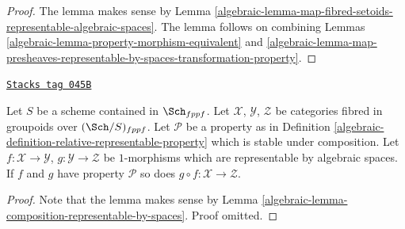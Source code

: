 \begin{proof}

The lemma makes sense by
Lemma \ref{algebraic-lemma-map-fibred-setoids-representable-algebraic-spaces}.
The lemma follows on combining
Lemmas \ref{algebraic-lemma-property-morphism-equivalent}
and \ref{algebraic-lemma-map-presheaves-representable-by-spaces-transformation-property}.
\end{proof}

\begin{lemma}
\label{algebraic-lemma-composition-representable-transformations-property}
\href{https://stacks.math.columbia.edu/tag/045B}{\texttt{Stacks tag 045B}}

Let $S$ be a scheme contained in $\Sch_{fppf}$.
Let $\mathcal{X}$, $\mathcal{Y}$, $\mathcal{Z}$ be categories fibred
in groupoids over $(\Sch/S)_{fppf}$.
Let $\mathcal{P}$ be a property as in
Definition \ref{algebraic-definition-relative-representable-property}
which is stable under composition.
Let $f : \mathcal{X} \to \mathcal{Y}$,
$g : \mathcal{Y} \to \mathcal{Z}$ be $1$-morphisms which
are representable by algebraic spaces.
If $f$ and $g$ have property $\mathcal{P}$ so does
$g \circ f : \mathcal{X} \to \mathcal{Z}$.
\end{lemma}

\begin{proof}

Note that the lemma makes sense by
Lemma \ref{algebraic-lemma-composition-representable-by-spaces}.
Proof omitted.
\end{proof}

